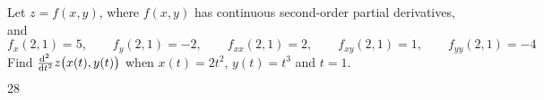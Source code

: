 \begin{question}[M200 2012a] %
Let $z = f(x, y)$, where $f(x, y)$ has continuous second-order partial derivatives, 
and
\begin{equation*}
f_x (2, 1) = 5, \qquad
f_y(2, 1) =-2, \qquad
f_{xx}(2, 1) = 2,\qquad
f_{xy}(2, 1) = 1, \qquad
f_{yy}(2, 1) = -4
\end{equation*}
Find 
$
\difftwo{}{t} z\big(x(t),y(t)\big)
$
when $x(t)=2t^2$, $y(t)=t^3$ and $t=1$.
\end{question}

%

\begin{answer}
$28$
\end{answer}

